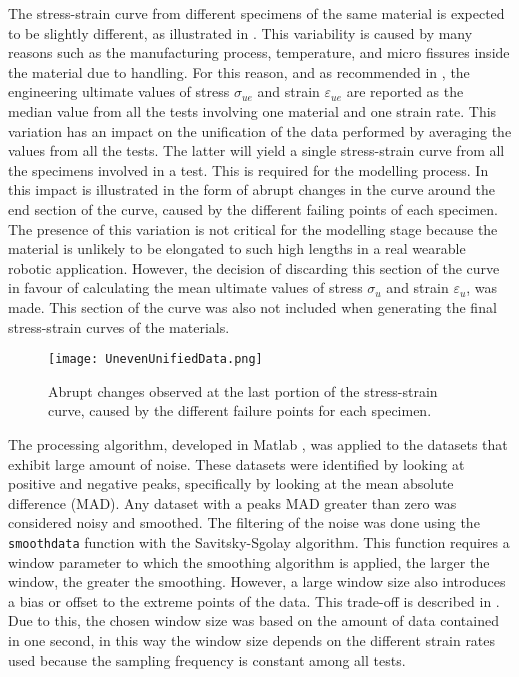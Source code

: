 The stress-strain curve from different specimens of the same material is expected to be slightly different, as illustrated in . This variability is caused by many reasons such as the manufacturing process, temperature, and micro fissures inside the material due to handling. For this reason, and as recommended in \cite{astmd638,astmd412}, the engineering ultimate values of stress $\sigma_{ue}$ and strain $\varepsilon_{ue}$ are reported as the median value from all the tests involving one material and one strain rate. This variation has an impact on the unification of the data performed by averaging the values from all the tests. The latter will yield a single stress-strain curve from all the specimens involved in a test. This is required for the modelling process. In  this impact is illustrated in the form of abrupt changes in the curve around the end section of the curve, caused by the different failing points of each specimen. The presence of this variation is not critical for the modelling stage because the material is unlikely to be elongated to such high lengths in a real wearable robotic application. However, the decision of discarding this section of the curve in favour of calculating the mean ultimate values of stress $\sigma_u$ and strain $\varepsilon_u$, was made. This section of the curve was also not included when generating the final stress-strain curves of the materials.

\begin{figure}[htb!]
    \centering
    \texttt{[image: UnevenUnifiedData.png]}
    \caption{Abrupt changes observed at the last portion of the stress-strain curve, caused by the different failure points for each specimen.}
    \label{fig:unevenData}
\end{figure}

The processing algorithm, developed in Matlab \textregistered{}, was applied to the datasets that exhibit large amount of noise. These datasets were identified by looking at positive and negative peaks, specifically by looking at the mean absolute difference (MAD). Any dataset with a peaks MAD greater than zero was considered noisy and smoothed. The filtering of the noise was done using the \texttt{smoothdata} function with the Savitsky-Sgolay algorithm. This function requires a window parameter to which the smoothing algorithm is applied, the larger the window, the greater the smoothing. However, a large window size also introduces a bias or offset to the extreme points of the data. This trade-off is described in \cite{sadeghi2018optimum}. Due to this, the chosen window size was based on the amount of data contained in one second, in this way the window size depends on the different strain rates used because the sampling frequency is constant among all tests. 

